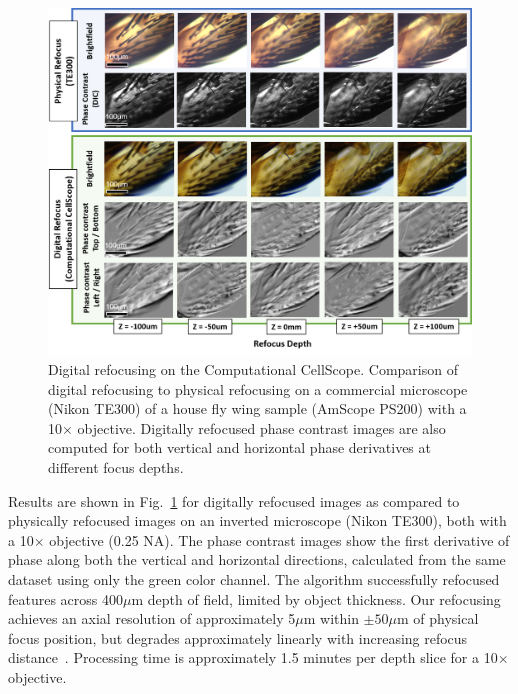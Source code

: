 \begin{figure}
\begin{center}
\includegraphics[width=\textwidth]{figures/fig_ccs_refocus.png}
\end{center}

\caption { {Digital refocusing on the Computational CellScope.} Comparison of digital refocusing to physical refocusing on a commercial microscope (Nikon TE300) of a house fly wing sample (AmScope PS200) with a 10$\times$ objective. Digitally refocused phase contrast images are also computed for both vertical and horizontal phase derivatives at different focus depths.}

\label{fig:fabrication:digrefocus}
\end{figure}

Results are shown in Fig.~\ref{fig:fabrication:digrefocus} for digitally refocused images as compared to physically refocused images on an inverted microscope (Nikon TE300), both with a 10$\times$ objective (0.25 NA). The phase contrast images show the first derivative of phase along both the vertical and horizontal directions, calculated from the same dataset using only the green color channel. The algorithm successfully refocused features across 400$\mu$m depth of field, limited by object thickness. Our refocusing achieves an axial resolution of approximately 5$\mu$m within $\pm50\mu$m of physical focus position, but degrades approximately linearly with increasing refocus distance~\cite{Tian14}. Processing time is approximately 1.5 minutes per depth slice for a 10$\times$ objective.

